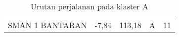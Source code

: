 \begin{table}[h!]
\begin{adjustbox}{width=\columnwidth,center}
\begin{tabular}{lllcl}
SMAN   1 BANTARAN                                                                          & -7,84                                                                                          & 113,18                                                                                          & A                                       & 11                                                                                
\end{tabular}
\end{adjustbox}
\caption{Urutan perjalanan pada klaster A}
\label{tab:datahasil}
\end{table}